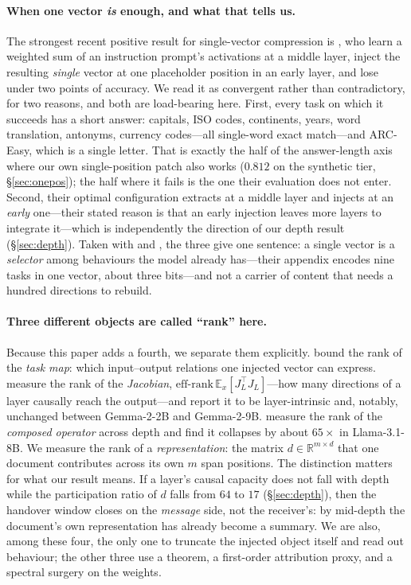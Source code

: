 \documentclass{article}
\newcommand{\dvec}{\ensuremath{d}}
\begin{document}
\paragraph{When one vector \emph{is} enough, and what that tells us.}
The strongest recent positive result for single-vector compression is
\citet{ardoin2026promptcompression}, who learn a weighted sum of an instruction
prompt's activations at a middle layer, inject the resulting \emph{single}
vector at one placeholder position in an early layer, and lose under two points
of accuracy. We read it as convergent rather than contradictory, for two
reasons, and both are load-bearing here. First, every task on which it succeeds
has a short answer: capitals, ISO codes, continents, years, word translation,
antonyms, currency codes---all single-word exact match---and ARC-Easy, which is
a single letter. That is exactly the half of the answer-length axis where our
own single-position patch also works ($0.812$ on the synthetic tier,
\S\ref{sec:onepos}); the half where it fails is the one their evaluation does
not enter. Second, their optimal configuration extracts at a middle layer and
injects at an \emph{early} one---their stated reason is that an early injection
leaves more layers to integrate it---which is independently the direction of our
depth result (\S\ref{sec:depth}). Taken with \citet{dong2026taskvectorlimits}
and \citet{wiegreffe2025mcq}, the three give one sentence: a single vector is a
\emph{selector} among behaviours the model already has---their appendix encodes
nine tasks in one vector, about three bits---and not a carrier of content that
needs a hundred directions to rebuild.

\paragraph{Three different objects are called ``rank'' here.} Because this paper
adds a fourth, we separate them explicitly. \citet{dong2026taskvectorlimits}
bound the rank of the \emph{task map}: which input--output relations one
injected vector can express. \citet{sarkar2026causaldim} measure the rank of the
\emph{Jacobian}, $\mathrm{eff\text{-}rank}\,\mathbb{E}_x[J_L^\top J_L]$---how
many directions of a layer causally reach the output---and report it to be
layer-intrinsic and, notably, unchanged between Gemma-2-2B and Gemma-2-9B.
\citet{fernando2026residualspectral} measure the rank of the \emph{composed
operator} across depth and find it collapses by about $65\times$ in
Llama-3.1-8B. We measure the rank of a \emph{representation}: the matrix
$\dvec\in\mathbb{R}^{m\times d}$ that one document contributes across its own
$m$ span positions. The distinction matters for what our result means. If a
layer's causal capacity does not fall with depth \citep{sarkar2026causaldim}
while the participation ratio of $\dvec$ falls from $64$ to $17$
(\S\ref{sec:depth}), then the handover window closes on the \emph{message} side,
not the receiver's: by mid-depth the document's own representation has already
become a summary. We are also, among these four, the only one to truncate the
injected object itself and read out behaviour; the other three use a theorem, a
first-order attribution proxy, and a spectral surgery on the weights.
\end{document}
